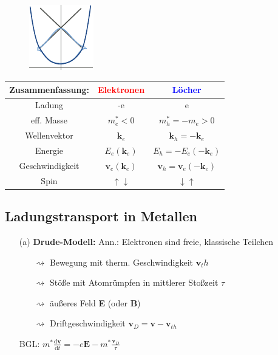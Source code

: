 \begin{itemize}
\begin{align*}
        \end{align*}
        \begin{figure}[H]
            \centering
            \includegraphics{figures/6_4Chaos.pdf}
            \caption{}
            \label{}
        \end{figure}
        \begin{table}[H]
            \centering
            \begin{tabular}{c|c|c}
                \textbf{Zusammenfassung:} & \textcolor{red}{Elektronen} & \textcolor{blue}{Löcher} \\ \hline \hline
                Ladung & -e & e \\
                eff. Masse & $m_e^* < 0$ & $m_h^* = - m_e > 0$ \\
                Wellenvektor & $\textbf{k}_e$ & $\textbf{k}_h = - \textbf{k}_e$ \\
                Energie & $E_e(\textbf{k}_e)$ & $E_h = - E_e(-\textbf{k}_e)$ \\
                Geschwindigkeit & $\textbf{v}_e(\textbf{k}_e)$ & $ \textbf{v}_h = \textbf{v}_e (- \textbf{k}_e)$ \\
                Spin & $\uparrow \downarrow$ & $ \downarrow \uparrow $
            \end{tabular}
        \end{table}
\end{itemize}



\subsection{Ladungstransport in Metallen} \label{sec:6_3}
\begin{itemize}
    \item[(a)] \textbf{Drude-Modell:}
    Ann.: Elektronen sind freie, klassische Teilchen
    \begin{itemize}
        \item[$\rightsquigarrow$] Bewegung mit therm. Geschwindigkeit $\textbf{v}_th$
        \item[$\rightsquigarrow$] Stöße mit Atomrümpfen in mittlerer Stoßzeit $\tau$
        \item[$\rightsquigarrow$] äußeres Feld \textbf{E} (oder \textbf{B}) 
        \item[$\rightsquigarrow$] Driftgeschwindigkeit $\textbf{v}_D = \textbf{v} - \textbf{v}_{th}$
    \end{itemize}
    BGL: $m^* \frac{\mathrm{d} \textbf{v}}{\mathrm{d}t} = - e \textbf{E} - m^* \frac{\textbf{v}_D}{\tau}$
\end{itemize}